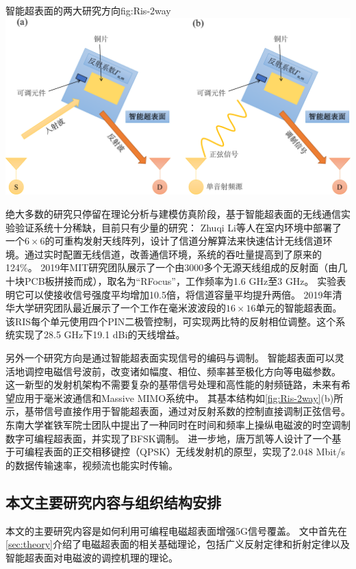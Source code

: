 \documentclass[supercite]{HustGraduPaper}
\begin{document}
\begin{generalfig}[htb]{智能超表面的两大研究方向}{fig:Ris-2way}
	\includegraphics[width=0.8\linewidth]{Figures/Ris-2way.pdf}
\end{generalfig}

绝大多数的研究只停留在理论分析与建模仿真阶段，基于智能超表面的无线通信实验验证系统十分稀缺，目前只有少量的研究：
Zhuqi Li等人在室内环境中部署了一个$ 6 \times 6 $的可重构发射天线阵列，设计了信道分解算法来快速估计无线信道环境\cite{li2019towards}。通过实时配置无线信道，改善通信环境，系统的吞吐量提高到了原来的124\%。
2019年MIT研究团队展示了一个由3000多个无源天线组成的反射面（由几十块PCB板拼接而成），取名为“RFocus”，工作频率为1.6 GHz至3 GHz。
实验表明它可以使接收信号强度平均增加10.5倍，将信道容量平均提升两倍\cite{arun2019rfocus}。
2019年清华大学研究团队最近展示了一个工作在毫米波波段的$ 16 \times 16 $单元的智能超表面。
该RIS每个单元使用四个PIN二极管控制，可实现两比特的反射相位调整。这个系统实现了28.5 GHz下19.1 dBi的天线增益\cite{Dai2020}。

另外一个研究方向是通过智能超表面实现信号的编码与调制。
智能超表面可以灵活地调控电磁信号波前，改变诸如幅度、相位、频率甚至极化方向等电磁参数\cite{CHN_zhou2020}。
这一新型的发射机架构不需要复杂的基带信号处理和高性能的射频链路，未来有希望应用于毫米波通信和Massive MIMO系统中。
其基本结构如\autoref{fig:Ris-2way}(b)所示，基带信号直接作用于智能超表面，通过对反射系数的控制直接调制正弦信号。
东南大学崔铁军院士团队中提出了一种同时在时间和频率上操纵电磁波的时空调制数字可编程超表面，并实现了BFSK调制\cite{zhao2019programmable}。
进一步地，唐万凯等人设计了一个基于可编程表面的正交相移键控（QPSK）无线发射机的原型，实现了2.048 Mbit/s的数据传输速率，视频流也能实时传输\cite{Tang2019Wireless}。

\subsection{本文主要研究内容与组织结构安排}

本文的主要研究内容是如何利用可编程电磁超表面增强5G信号覆盖。
文中首先在\autoref{sec:theory}介绍了电磁超表面的相关基础理论，包括广义反射定律和折射定律以及智能超表面对电磁波的调控机理的理论。
\end{document}
